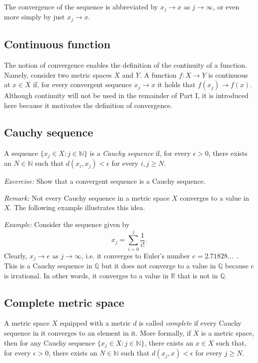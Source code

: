 \documentclass[aps,prl,twocolumn,groupedaddress]{revtex4-2}
\newcommand{\NN}{\mathbb{N}}
\newcommand{\QQ}{\mathbb{Q}}
\newcommand{\RR}{\mathbb{R}}
\begin{document}
The convergence of the sequence is abbreviated by $x_j\to x$ as $j\to \infty$, or even more simply by just $x_j\to x$.


\subsection{Continuous function}

The notion of convergence enables the definition of the continuity of a function.
Namely, consider two metric spaces $X$ and $Y$.
A function $f:X\to Y$ is continuous at $x\in X$ if, for every convergent sequence $x_j \to x$ it holds that $f(x_j)\to f(x)$.
Although continuity will not be used in the remainder of Part I, it is introduced here because it motivates the definition of convergence.

\subsection{
Cauchy sequence
\label{sec:cauchy}
}

A sequence $\{x_j\in X:j\in \NN\}$ is a {\em Cauchy sequence} if, for every $\epsilon>0$, there exists an $N\in \NN$ such that $d(x_i,x_j)<\epsilon$ for every $i,j\geq N$.

{\em Excercise:} Show that a convergent sequence is a Cauchy sequence.

{\em Remark:} Not every Cauchy sequence in a metric space $X$ converges to a value in $X$.
The following example illustrates this idea.

{\em Example:}
Consider the sequence given by
$$
x_j = \sum_{i=0}^j \frac{1}{i!}.
$$
Clearly, $x_j\to e$ as $j\to \infty$, i.e. it converges to Euler's number $e=2.71828...$~.
This is a Cauchy sequence in $\QQ$ but it does not converge to a value in $\QQ$ because $e$ is irrational.
In other words, it converges to a value in $\RR$ that is not in $\QQ$.

\subsection{Complete metric space}

A metric space $X$ equipped with a metric $d$ is called {\em complete} if every Cauchy sequence in it converges to an element in it.
More formally, if $X$ is a metric space, then for any Cauchy sequence $\{x_j\in X:j\in \NN\}$, there exists an $x\in X$ such that, for every $\epsilon>0$, there exists an $N\in \NN$ such that $d(x_j,x)<\epsilon$ for every $j\geq N$.
\end{document}

